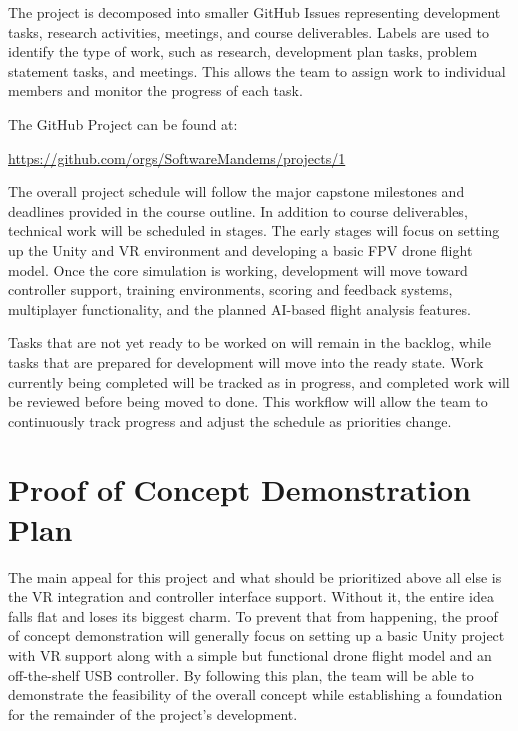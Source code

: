 \documentclass{article}
\begin{document}
\vspace{0.75em}

The project is decomposed into smaller GitHub Issues representing development
tasks, research activities, meetings, and course deliverables. Labels are used
to identify the type of work, such as research, development plan tasks, problem
statement tasks, and meetings. This allows the team to assign work to individual
members and monitor the progress of each task.

The GitHub Project can be found at:

\begin{center}
\url{https://github.com/orgs/SoftwareMandems/projects/1}
\end{center}

The overall project schedule will follow the major capstone milestones and
deadlines provided in the course outline. In addition to course deliverables,
technical work will be scheduled in stages. The early stages will focus on setting up the Unity and VR environment and developing a basic FPV drone flight model.
Once the core simulation is working, development will move toward controller
support, training environments, scoring and feedback systems, multiplayer
functionality, and the planned AI-based flight analysis features.

Tasks that are not yet ready to be worked on will remain in the backlog, while
tasks that are prepared for development will move into the ready state. Work
currently being completed will be tracked as in progress, and completed work
will be reviewed before being moved to done. This workflow will allow the team
to continuously track progress and adjust the schedule as priorities change.


\section{Proof of Concept Demonstration Plan}

The main appeal for this project and what should be prioritized above all else
is the VR integration and controller interface support. Without it, the entire
idea falls flat and loses its biggest charm. To prevent that from happening, the proof of concept
demonstration will generally focus on setting up a basic Unity project with VR support along
with a simple but functional drone flight model and an off-the-shelf USB controller.
By following this plan, the team will be able to demonstrate the feasibility of the 
overall concept while establishing a foundation for the remainder of the project's
development.
\end{document}
